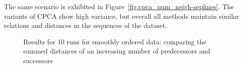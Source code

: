 \documentclass[pdftex,12pt,a4paper]{report}
\begin{document}
The same scenario is exhibited in Figure~\ref{fig:cpca_num_neigh-seplines}.
The variants of CPCA show high variance, but overall all methods maintain similar relations and distances in the sequences of the dataset.

\begin{figure}[htb!]
    \caption{Results for 10 runs for smoothly ordered data: comparing the summed distances of an increasing number of predecessors and successors}\label{fig:cpca-num_neigh_onelines}
\end{figure}
\end{document}
